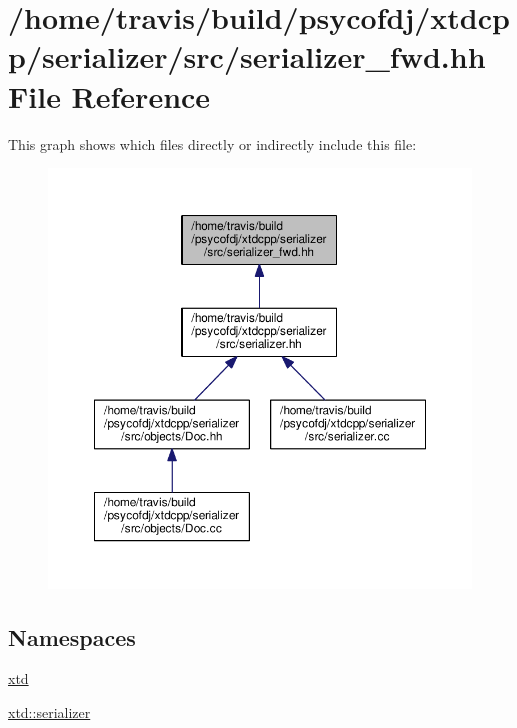 \hypertarget{serializer__fwd_8hh}{\section{/home/travis/build/psycofdj/xtdcpp/serializer/src/serializer\-\_\-fwd.hh File Reference}
\label{serializer__fwd_8hh}
}
This graph shows which files directly or indirectly include this file\-:
\nopagebreak
\begin{figure}[H]
\begin{center}
\leavevmode
\includegraphics[width=350pt]{serializer__fwd_8hh__dep__incl}
\end{center}
\end{figure}
\subsection*{Namespaces}
\begin{DoxyCompactItemize}
\item 
\hyperlink{namespacextd}{xtd}
\item 
\hyperlink{namespacextd_1_1serializer}{xtd\-::serializer}
\end{DoxyCompactItemize}

